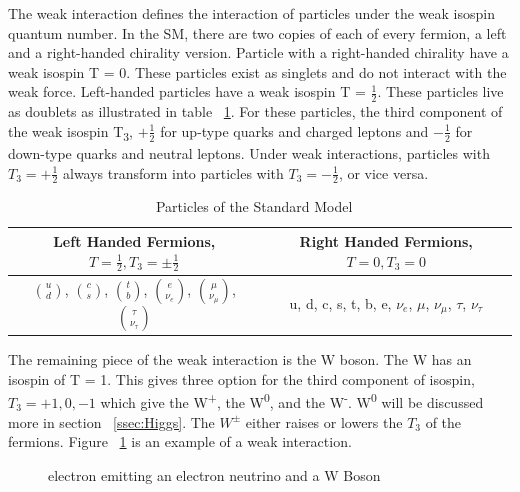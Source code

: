 \indent The weak interaction defines the interaction of particles under the weak isospin quantum number. In the SM, there are two copies of each of every fermion, a left and a right-handed chirality version. Particle with a right-handed chirality have a weak isospin T = 0. These particles exist as singlets and do not interact with the weak force. Left-handed particles have a weak isospin T =  ${\frac{1}{2}}$. These particles live as doublets as illustrated in table ~\ref{tab:chiral}. For these particles, the third component of the weak isospin T\textsubscript{3}, ${+\frac{1}{2}}$ for up-type quarks and charged leptons and ${-\frac{1}{2}}$ for down-type quarks and neutral leptons. Under weak interactions, particles with ${T_{3} = +\frac{1}{2}}$ always transform into particles with ${T_{3} = -\frac{1}{2}}$, or vice versa.\linebreak

\begin{table}[h]
\begin{center}
\def\arraystretch{1.5}
\begin{tabular}[h]{|c|c|}
\hline
Left Handed Fermions, ${T = \frac{1}{2}, T_{3} = \pm\frac{1}{2}}$ & Right Handed Fermions, ${T = 0, T_{3} = 0}$\\
\hline\hline
${\binom{u}{d}}$, ${\binom{c}{s}}$, ${\binom{t}{b}}$, ${\binom{e}{\nu_{e}}}$, ${\binom{\mu}{\nu_{\mu}}}$, ${\binom{\tau}{\nu_{\tau}}}$ & u, d, c, s, t, b, e, ${\nu_{e}}$, ${\mu}$, ${\nu_{\mu}}$, ${\tau}$, ${\nu_{\tau}}$ \\
\hline
\end{tabular}
\caption{Particles of the Standard Model ~\cite{Ian:2018}}
\label{tab:chiral}
\end{center}
\end{table}


 \indent The remaining piece of the weak interaction is the W boson. The W has an isospin of T = 1. This gives three option for the third component of isospin, ${T_{3} = +1, 0, -1}$ which give the W\textsuperscript{+}, the W\textsuperscript{0}, and the W\textsuperscript{-}. W\textsuperscript{0} will be discussed more in section ~\ref{ssec:Higgs}. The ${W^{\pm}}$ either raises or lowers the ${T_{3}}$ of the fermions. Figure ~\ref{Fig:weak_dia} is an example of a weak interaction.\linebreak

\begin{figure}[h]
\begin{center}

\caption{electron emitting an electron neutrino and a W Boson}
\label{Fig:weak_dia}
\end{center}
\end{figure}

